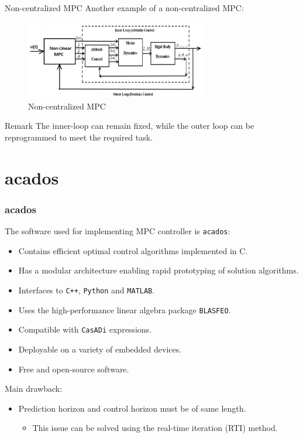 \documentclass{thesisbeamer}
\newcommand\Fontvi{\fontsize{9}{10}\selectfont}
\begin{document}
\begin{frame}[t]{Non-centralized MPC}
	\Fontvi
	Another example of a non-centralized MPC:
	\begin{figure}
		\includegraphics[width=0.7\textwidth]{Images/Control/non-centralized_mpc_3.png}
				\caption{Non-centralized MPC}
	\end{figure}
	\begin{alertblock}{Remark}
	 	The inner-loop can remain fixed, while the outer loop can be reprogrammed to meet the required task.
	 \end{alertblock} 
	 \vspace{5mm}
\end{frame}

\section{acados}

\begin{frame}
	\frametitle{acados}
	\Fontvi
	The software used for implementing MPC controller is \texttt{acados}:
	
	\begin{itemize}
	\item Contains efficient optimal control algorithms implemented in C.
	\item Has a modular architecture enabling rapid prototyping of solution algorithms.
	\item Interfaces to \texttt{C++}, \texttt{Python} and \texttt{MATLAB}.
	\item Uses the high-performance linear algebra package \texttt{BLASFEO}.
	\item Compatible with \texttt{CasADi} expressions.
	\item Deployable on a variety of embedded devices.
	\item Free and open-source software.
\end{itemize}

Main drawback:

\begin{itemize}
	\item Prediction horizon and control horizon must be of same length. 
		\begin{itemize}
			\item This issue can be solved using the real-time iteration (RTI) method.
		\end{itemize}
\end{itemize}

\end{frame}
\end{document}
